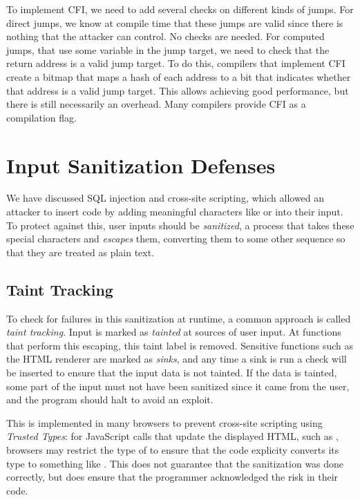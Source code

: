 To implement CFI, we need to add several checks on different kinds of jumps. For direct jumps, we know at compile time that these jumps are valid since there is nothing that the attacker can control. No checks are needed. For computed jumps, that use some variable in the jump target, we need to check that the return address is a valid jump target. To do this, compilers that implement CFI create a bitmap that maps a hash of each address to a bit that indicates whether that address is a valid jump target. This allows achieving good performance, but there is still necessarily an overhead. Many compilers provide CFI as a compilation flag.

\section{Input Sanitization Defenses}
We have discussed SQL injection and cross-site scripting, which allowed an attacker to insert code by adding meaningful characters like  or \ttt{>}into their input. To protect against this, user inputs should be \emph{sanitized}, a process that takes these special characters and \emph{escapes} them, converting them to some other sequence so that they are treated as plain text. 

\subsection{Taint Tracking}
To check for failures in this sanitization at runtime, a common approach is called \emph{taint tracking}. Input is marked as \emph{tainted} at sources of user input. At functions that perform this escaping, this taint label is removed. Sensitive functions such as the HTML renderer are marked as \emph{sinks}, and any time a sink is run a check will be inserted to ensure that the input data is not tainted. If the data is tainted, some part of the input must not have been sanitized since it came from the user, and the program should halt to avoid an exploit.

This is implemented in many browsers to prevent cross-site scripting using \emph{Trusted Types}: for JavaScript calls that update the displayed HTML, such as , browsers may restrict the type of  to ensure that the code explicity converts its type to something like . This does not guarantee that the sanitization was done correctly, but does ensure that the programmer acknowledged the risk in their code.
